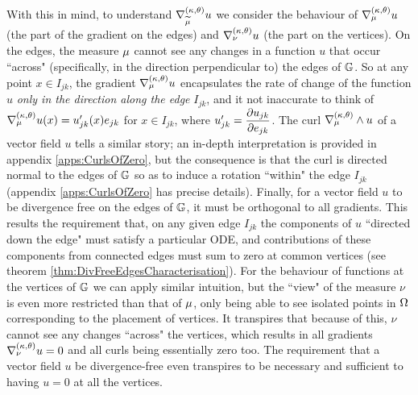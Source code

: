 With this in mind, to understand $\nabla^{\left( \kappa, \theta \right)}_{\widetilde{\mu}}u$ we consider the behaviour of $\nabla^{\left( \kappa, \theta \right)}_{\mu}u$ (the part of the gradient on the edges) and $\nabla^{\left( \kappa, \theta \right)}_{\nu}u$ (the part on the vertices).
On the edges, the measure $\mu$ cannot see any changes in a function $u$ that occur ``across" (specifically, in the direction perpendicular to) the edges of $\mathbb{G}$.
So at any point $x\in I_{jk}$, the gradient $\nabla^{\left( \kappa, \theta \right)}_{\mu}u$ encapsulates the rate of change of the function $u$ \emph{only in the direction along the edge} $I_{jk}$, and it not inaccurate to think of $\nabla^{\left( \kappa, \theta \right)}_{\mu}u(x) = u_{jk}'(x)e_{jk}$ for $x\in I_{jk}$, where $u_{jk}' = \dfrac{\partial u_{jk}}{\partial e_{jk}}$.
The curl $\nabla_{\mu}^{\left( \kappa, \theta \right)}\wedge u$ of a vector field $u$ tells a similar story; an in-depth interpretation is provided in appendix \ref{apps:CurlsOfZero}, but the consequence is that the curl is directed normal to the edges of $\mathbb{G}$ so as to induce a rotation ``within" the edge $I_{jk}$ (appendix \ref{apps:CurlsOfZero} has precise details).
Finally, for a vector field $u$ to be divergence free on the edges of $\mathbb{G}$, it must be orthogonal to all gradients.
This results the requirement that, on any given edge $I_{jk}$ the components of $u$ ``directed down the edge" must satisfy a particular ODE, and contributions of these components from connected edges must sum to zero at common vertices (see theorem \ref{thm:DivFreeEdgesCharacterisation}).
For the behaviour of functions at the vertices of $\mathbb{G}$ we can apply similar intuition, but the ``view" of the measure $\nu$ is even more restricted than that of $\mu$, only being able to see isolated points in $\Omega$ corresponding to the placement of vertices.
It transpires that because of this, $\nu$ cannot see any changes ``across" the vertices, which results in all gradients $\nabla^{\left( \kappa, \theta \right)}_{\nu}u=0$ and all curls being essentially zero too.
The requirement that a vector field $u$ be divergence-free even transpires to be necessary and sufficient to having $u=0$ at all the vertices.

